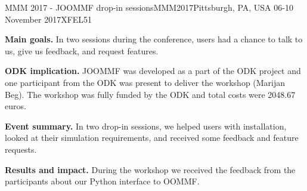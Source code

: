 \begin{event}{MMM 2017 - JOOMMF drop-in sessions}{MMM2017}{Pittsburgh, PA, USA 06-10 November 2017}{XFEL}{5}{1}{}

\textbf{Main goals.} In two sessions during the conference, users had a chance to talk to us, give us feedback, and request features.

\textbf{ODK implication.} JOOMMF was developed as a part of the ODK project and one participant from the ODK was present to deliver the workshop (Marijan Beg). The workshop was fully funded by the ODK and total costs were 2048.67 euros.

\textbf{Event summary.} In two drop-in sessions, we helped users with installation, looked at their simulation requirements, and received some feedback and feature requests.

\textbf{Results and impact.} During the workshop we received the feedback from the participants about our Python interface to OOMMF.

\end{event}
